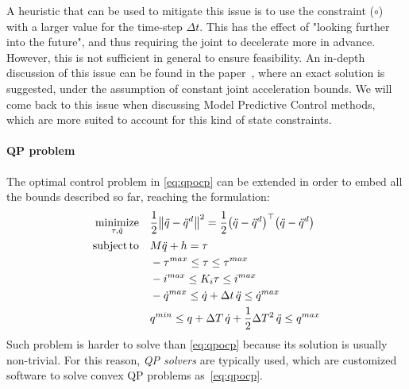 	A heuristic that can be used to mitigate this issue is to use the constraint ($\circ$) with a larger value for the time-step $\Delta t$.
	This has the effect of "looking further into the future", and thus requiring the joint to decelerate more in advance.
	However, this is not sufficient in general to ensure feasibility.
	An in-depth discussion of this issue can be found in the paper~\cite{DelPreteRAL2018}, where an exact solution is suggested, under the assumption of constant joint acceleration bounds.
	We will come back to this issue when discussing Model Predictive Control methods, which are more suited to account for this kind of state constraints.
	
	
	\paragraph{QP problem} 
	The optimal control problem in \eqref{eq:qpocp} can be extended in order to embed all the bounds described so far, reaching the formulation:
	\begin{equation} \label{eq:qp}
		\begin{split}
			\operatorname*{minimize}_{\tau, \ddot q}\quad & \frac 1 2 \big\|\ddot q - \ddot q^d \big\|^2 = \frac 1 2 \big(\ddot q - \ddot q^d\big)^\top \big(\ddot q - \ddot q^d\big) \\
			\operatorname*{subject\,to} \quad & M \ddot q + h = \tau \\
			& -\tau^{max} \leq \tau \leq \tau^{max} \\
			& -i^{max} \leq K_i \tau \leq i^{max} \\
			& -\dot q^{max} \leq \dot q + \Delta t \, \ddot q \leq \dot q^{max} \\
			& q^{min} \leq q + \Delta T\, \dot q + \frac 1 2 \Delta T^2 \, \ddot q \leq q^{max}
		\end{split}
	\end{equation}
	Such problem is harder to solve than \eqref{eq:qpocp} because its solution is usually non-trivial. 
	For this reason, \textit{QP solvers} are typically used, which are customized software to solve convex QP problems as~\eqref{eq:qpocp}.
	

